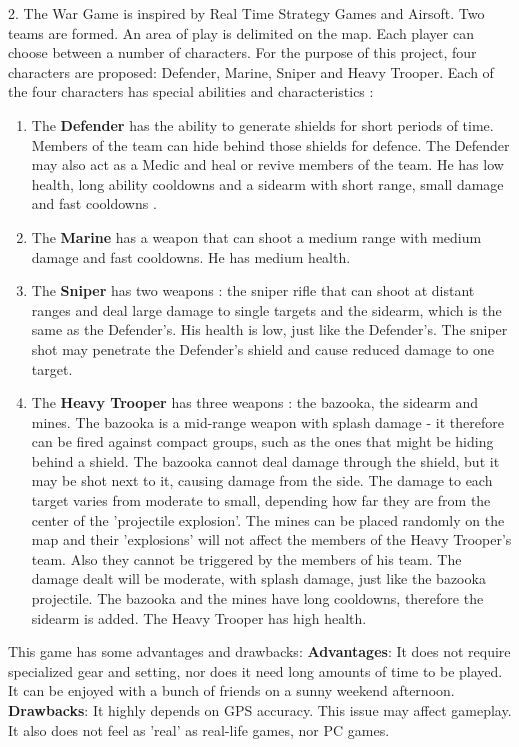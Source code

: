 \documentclass{article}
\begin{document}
2. The War Game is inspired by Real Time Strategy Games and Airsoft. Two
teams are formed. An area of play is delimited on the map. Each player can
choose between a number of characters. For the purpose of this project, four
characters are proposed: Defender, Marine, Sniper and Heavy Trooper. Each of the
four characters has special abilities and characteristics :
\begin{enumerate}
	
	\item The \textbf{Defender} has the ability to generate shields for short
	periods of time. Members of the team can hide behind those shields for defence.
	The Defender may also act as a Medic and heal or revive members of the team. He
	has low health, long ability cooldowns and a sidearm with short range, small
	damage and fast cooldowns .
	
	\item The \textbf{Marine} has a weapon that can shoot a medium range with
	medium damage and fast cooldowns. He has medium health. 
	
	\item The \textbf{Sniper} has two weapons : the sniper rifle that can shoot at
	distant ranges and deal large damage to single targets and the sidearm, which
	is the same as the Defender's. His health is low, just like the Defender's. The
	sniper shot may penetrate the Defender's shield and cause reduced damage to one
	target.	
	
	\item The \textbf{Heavy Trooper} has three weapons : the bazooka, the sidearm
	and mines. The bazooka is a mid-range weapon with splash damage - it therefore
	can be fired against compact groups, such as the ones that might be hiding
	behind a shield. The bazooka cannot deal damage through the shield, but it may
	be shot next to it, causing damage from the side. The damage to each target
	varies from moderate to small, depending how far they are from the center of
	the 'projectile explosion'. The mines can be placed randomly on the map and
	their 'explosions' will not affect the members of the Heavy Trooper's team.
	Also they cannot be triggered by the members of his team. The damage dealt will
	be moderate, with splash damage, just like the bazooka projectile. The bazooka
	and the mines have long cooldowns, therefore the sidearm is added. The Heavy
	Trooper has high health.
	 
\end{enumerate}

This game has some advantages and drawbacks:\newline
\textbf{Advantages}: It does not require specialized gear and setting, nor does
it need long amounts of time to be played. It can be enjoyed with a bunch of
friends on a sunny weekend afternoon.\newline
\textbf{Drawbacks}: It highly depends on GPS accuracy. This issue may affect
gameplay. It also does not feel as 'real' as real-life games, nor PC
games.\newline
\end{document}
